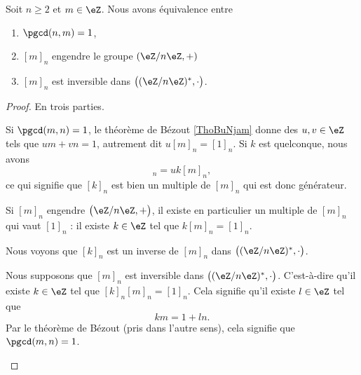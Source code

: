 \begin{proposition}       \label{PROPooMTWGooEMbvDi}
	Soit \( n\geq 2\) et \( m\in \eZ\). Nous avons équivalence entre
	\begin{enumerate}
		\item	\label{ITEMooMCIJooItgSHc}
		      \( \pgcd(n,m)=1\),
		\item		\label{ITEMooMNKCooPnpyye}
		      \( [m]_n\) engendre le groupe \( (\eZ/n\eZ,+)\)
		\item		\label{ITEMooBPWLooFLdJfr}
		      \( [m]_n\) est inversible dans \( \big( (\eZ/n\eZ)^*,\cdot \big)\).
	\end{enumerate}
\end{proposition}

\begin{proof}
	En trois parties.
	\begin{subproof}

		Si \( \pgcd(m,n)=1\), le théorème de Bézout \ref{ThoBuNjam} donne des \( u,v\in \eZ\) tels que \( um+vn=1\), autrement dit \( u[m]_n=[1]_n\). Si \( k\) est quelconque, nous avons
		\begin{equation}
			[k]_n=uk[m]_n,
		\end{equation}
		ce qui signifie que \( [k]_n\) est bien un multiple de \( [m]_n\) qui est donc générateur.


		Si \( [m]_n\) engendre \( \big( \eZ/n\eZ,+ \big)\), il existe en particulier un multiple de \( [m]_n\) qui vaut \( [1]_n\) : il existe \( k\in \eZ\) tel que \( k[m]_n=[1]_n\).

		Nous voyons que \( [k]_n\) est un inverse de \( [m]_n\) dans \( \big( (\eZ/n\eZ)^*,\cdot \big)\).


		Nous supposons que \( [m]_n\) est inversible dans \( \big( (\eZ/n\eZ)^*,\cdot \big)\). C'est-à-dire qu'il existe \( k\in \eZ\) tel que \( [k]_n[m]_n=[1]_n\). Cela signifie qu'il existe \( l\in \eZ\) tel que
		\begin{equation}
			km=1+ln.
		\end{equation}
		Par le théorème de Bézout (pris dans l'autre sens), cela signifie que \( \pgcd(m,n)=1\).

	\end{subproof}
\end{proof}

